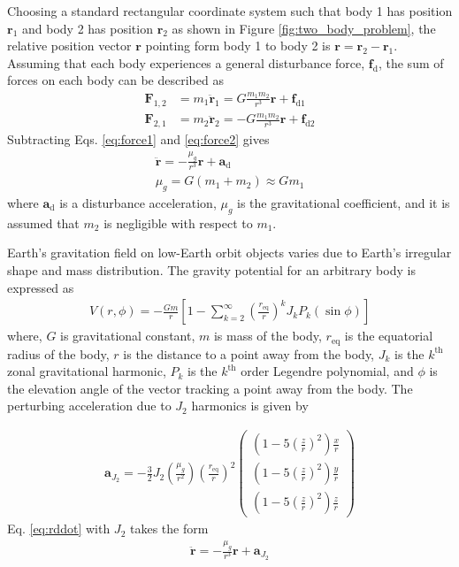 \documentclass[]{aiaa-tc}%
\begin{document}
Choosing a standard rectangular coordinate system such that body 1 has position $\mathbf{r}_1$ and body 2 has position $\mathbf{r}_2$ as shown in Figure \ref{fig:two_body_problem}, the relative position vector $\mathbf{r}$ pointing form body 1 to body 2 is $\mathbf{r}=\mathbf{r}_2-\mathbf{r}_1$. Assuming that each body experiences a general disturbance force, $\mathbf{f}_{\text{d}}$, the sum of forces on each body can be described as
\begin{subequations}
\begin{align}
\label{eq:force1}
\mathbf{F}_{1,2}&=m_1\mathbf{\ddot{r}}_1=G\frac{m_1m_2}{r^3}\mathbf{r}+\mathbf{f}_{\text{d1}}\\
\label{eq:force2}
\mathbf{F}_{2,1}&=m_2\mathbf{\ddot{r}}_2=-G\frac{m_1m_2}{r^3}\mathbf{r}+\mathbf{f}_{\text{d2}}
\end{align}
\end{subequations}
Subtracting Eqs. \eqref{eq:force1} and \eqref{eq:force2} gives
\begin{subequations}
\begin{gather}
\label{eq:rddot}
\mathbf{\ddot{r}}=-\frac{\mu_g}{r^3}\mathbf{r}+\mathbf{a}_{\text{d}}\\
\mu_g=G(m_1+m_2)\approx G m_1
\end{gather}
\end{subequations}
where $\mathbf{a}_{\text{d}}$ is a disturbance acceleration, $\mu_g$ is the gravitational coefficient, and it is assumed that $m_2$ is negligible with respect to $m_1$.

Earth's gravitation field on low-Earth orbit objects varies due to Earth's irregular shape and mass distribution. The gravity potential for an arbitrary body is expressed as \cite{schaub_analytical_2009}
\begin{align}
V(r,\phi)=-\frac{Gm}{r}\left[1-\sum\limits_{k=2}^\infty\left(\frac{r_{\text{eq}}}{r}\right)^k J_k P_k (\sin\phi)\right]
\end{align}
where, $G$ is gravitational constant, $m$ is mass of the body, $r_{\text{eq}}$ is the equatorial radius of the body, $r$ is the distance to a point away from the body, $J_k$ is the $k^{\text{th}}$ zonal gravitational harmonic, $P_k$ is the $k^{\text{th}}$ order Legendre polynomial, and $\phi$ is the elevation angle of the vector tracking a point away from the body. The perturbing acceleration due to $J_2$ harmonics is given by

\begin{align}
\mathbf{a}_{J_2}=-\frac{3}{2}J_2\left(\frac{\mu_g}{r^2}\right)\left(\frac{r_{\text{eq}}}{r}\right)^2\left(\begin{array}{c}
\left(1-5\left(\frac{z}{r}\right)^2\right)\frac{x}{r}\\
\left(1-5\left(\frac{z}{r}\right)^2\right)\frac{y}{r}\\
\left(1-5\left(\frac{z}{r}\right)^2\right)\frac{z}{r} \end{array}\right)
\end{align}
Eq. \eqref{eq:rddot} with $J_2$ takes the form
\begin{gather}
\mathbf{\ddot{r}}=-\frac{\mu_g}{r^3}\mathbf{r}+\mathbf{a}_{J_2}
\end{gather}
\end{document}
